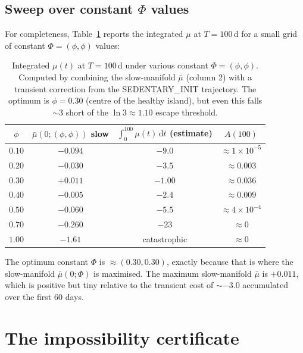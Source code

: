 \documentclass[11pt,a4paper]{article}
\theoremstyle{definition}
\newcommand{\dd}{\,\mathrm{d}}
\begin{document}
\subsection{Sweep over constant $\Phi$ values}

For completeness, Table~\ref{tab:phi-sweep} reports the integrated $\mu$ at $T = 100$\,d for a small grid of constant $\Phi = (\phi, \phi)$ values:

\begin{table}[h]
\centering\small
\begin{tabular}{cccc}
\toprule
$\phi$ & $\bar\mu(0; (\phi,\phi))$ slow & $\int_0^{100} \mu(t)\dd t$ (estimate) & $A(100)$ \\
\midrule
$0.10$ & $-0.094$ & $-9.0$  & $\approx 1\!\times\!10^{-5}$ \\
$0.20$ & $-0.030$ & $-3.5$  & $\approx 0.003$ \\
$0.30$ & $+0.011$ & $-1.00$ & $\approx 0.036$ \\
$0.40$ & $-0.005$ & $-2.4$  & $\approx 0.009$ \\
$0.50$ & $-0.060$ & $-5.5$  & $\approx 4\!\times\!10^{-4}$ \\
$0.70$ & $-0.260$ & $-23$   & $\approx 0$ \\
$1.00$ & $-1.61$ & catastrophic & $\approx 0$ \\
\bottomrule
\end{tabular}
\caption{Integrated $\mu(t)$ at $T=100$\,d under various constant $\Phi = (\phi,\phi)$. Computed by combining the slow-manifold $\bar\mu$ (column 2) with a transient correction from the SEDENTARY\_INIT trajectory. The optimum is $\phi = 0.30$ (centre of the healthy island), but even this falls $\sim 3$ short of the $\ln 3 \approx 1.10$ escape threshold.}
\label{tab:phi-sweep}
\end{table}

The optimum constant $\Phi$ is $\approx (0.30, 0.30)$, exactly because that is where the slow-manifold $\bar\mu(0; \Phi)$ is maximised. The maximum slow-manifold $\bar\mu$ is $+0.011$, which is positive but tiny relative to the transient cost of $\sim -3.0$ accumulated over the first 60 days.

\section{The impossibility certificate} \label{sec:impossibility}
\end{document}
